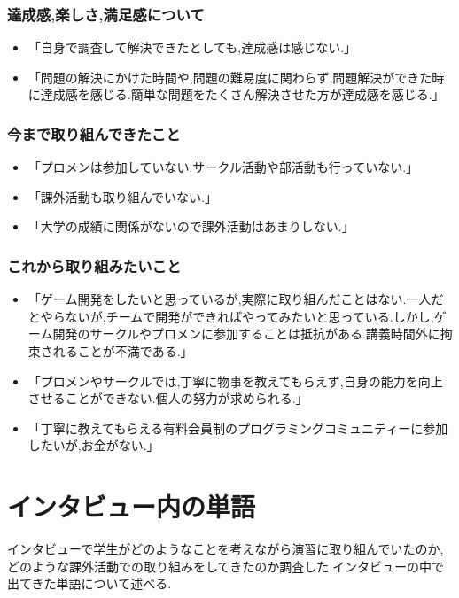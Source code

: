 \documentclass[11pt, a4paper]{jreport}
\begin{document}
\subsubsection{達成感,楽しさ,満足感について}

\begin{itemize}
\item 「自身で調査して解決できたとしても,達成感は感じない.」
\item 「問題の解決にかけた時間や,問題の難易度に関わらず,問題解決ができた時に達成感を感じる.簡単な問題をたくさん解決させた方が達成感を感じる.」
\end{itemize}

\subsubsection{今まで取り組んできたこと}

\begin{itemize}
\item 「プロメンは参加していない.サークル活動や部活動も行っていない.」
\item 「課外活動も取り組んでいない.」
\item 「大学の成績に関係がないので課外活動はあまりしない.」
\end{itemize}

\subsubsection{これから取り組みたいこと}

\begin{itemize}
\item 「ゲーム開発をしたいと思っているが,実際に取り組んだことはない.一人だとやらないが,チームで開発ができればやってみたいと思っている.しかし,ゲーム開発のサークルやプロメンに参加することは抵抗がある.講義時間外に拘束されることが不満である.」
\item 「プロメンやサークルでは,丁寧に物事を教えてもらえず,自身の能力を向上させることができない.個人の努力が求められる.」
\item 「丁寧に教えてもらえる有料会員制のプログラミングコミュニティーに参加したいが,お金がない.」
\end{itemize}


\section{インタビュー内の単語}

インタビューで学生がどのようなことを考えながら演習に取り組んでいたのか,どのような課外活動での取り組みをしてきたのか調査した.インタビューの中で出てきた単語について述べる.
\end{document}
